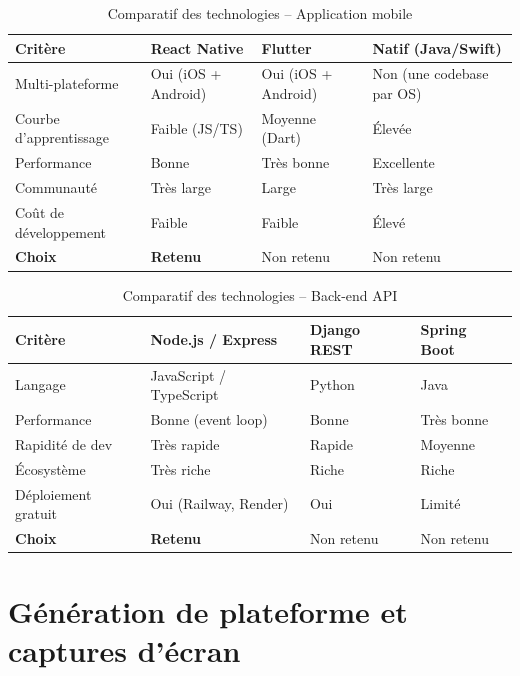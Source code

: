 \documentclass[12pt, a4paper]{report}
\begin{document}
\begin{table}[H]
\centering
\caption{Comparatif des technologies -- Application mobile}
\label{tab:techno}
\renewcommand{\arraystretch}{1.3}
\begin{tabularx}{\textwidth}{|l|X|X|X|}
\hline
\textbf{Critère} & \textbf{React Native} & \textbf{Flutter} & \textbf{Natif (Java/Swift)} \\
\hline
Multi-plateforme & Oui (iOS + Android) & Oui (iOS + Android) & Non (une codebase par OS) \\
\hline
Courbe d'apprentissage & Faible (JS/TS) & Moyenne (Dart) & Élevée \\
\hline
Performance & Bonne & Très bonne & Excellente \\
\hline
Communauté & Très large & Large & Très large \\
\hline
Coût de développement & Faible & Faible & Élevé \\
\hline
\textbf{Choix} & \textbf{Retenu} & Non retenu & Non retenu \\
\hline
\end{tabularx}
\end{table}

\begin{table}[H]
\centering
\caption{Comparatif des technologies -- Back-end \ac{API}}
\label{tab:backend}
\renewcommand{\arraystretch}{1.3}
\begin{tabularx}{\textwidth}{|l|X|X|X|}
\hline
\textbf{Critère} & \textbf{Node.js / Express} & \textbf{Django REST} & \textbf{Spring Boot} \\
\hline
Langage & JavaScript / TypeScript & Python & Java \\
\hline
Performance & Bonne (event loop) & Bonne & Très bonne \\
\hline
Rapidité de dev & Très rapide & Rapide & Moyenne \\
\hline
Écosystème & Très riche & Riche & Riche \\
\hline
Déploiement gratuit & Oui (Railway, Render) & Oui & Limité \\
\hline
\textbf{Choix} & \textbf{Retenu} & Non retenu & Non retenu \\
\hline
\end{tabularx}
\end{table}

\section{Génération de plateforme et captures d'écran}
\end{document}
